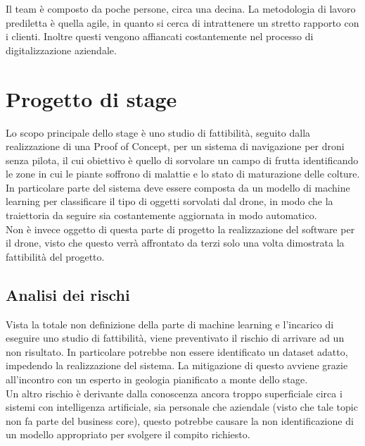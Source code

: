 Il team è composto da poche persone, circa una decina. La metodologia di lavoro prediletta è quella agile, in quanto si cerca di intrattenere un stretto rapporto con i clienti. Inoltre questi vengono affiancati costantemente nel processo di digitalizzazione aziendale.

\section{Progetto di stage}

Lo scopo principale dello stage è uno studio di fattibilità, seguito dalla realizzazione di una Proof of Concept, per un sistema di navigazione
per droni senza pilota, il cui obiettivo è quello di sorvolare un campo di frutta identificando le zone in cui le piante soffrono di malattie e lo stato
di maturazione delle colture.\\
In particolare parte del sistema deve essere composta da un modello di machine learning per classificare il tipo di oggetti sorvolati dal drone,
in modo che la traiettoria da seguire sia costantemente aggiornata in modo automatico.\\
Non è invece oggetto di questa parte di progetto la realizzazione del software per il drone, visto che questo verrà affrontato da terzi solo una volta dimostrata
la fattibilità del progetto.

\subsection{Analisi dei rischi}
Vista la totale non definizione della parte di machine learning e l'incarico di eseguire uno studio di fattibilità, viene preventivato il rischio di arrivare ad un non risultato.
In particolare potrebbe non essere identificato un dataset adatto, impedendo la realizzazione del sistema. La mitigazione di questo avviene grazie
all'incontro con un esperto in geologia pianificato a monte dello stage.\\
Un altro rischio è derivante dalla conoscenza ancora troppo superficiale circa i sistemi con intelligenza artificiale, sia personale che aziendale (visto che tale
topic non fa parte del business core), questo potrebbe causare la non identificazione di un modello appropriato per svolgere il compito richiesto.

